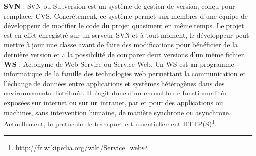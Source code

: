 \pagebreak

\textbf{SVN} : SVN ou Subversion est un système de gestion de version, conçu pour remplacer CVS. Concrètement, ce système permet aux membres d’une équipe de développeur de modifier le code du projet quasiment en même temps. Le projet est en effet enregistré sur un serveur SVN et à tout moment, le développeur peut mettre à jour une classe avant de faire des modifications pour bénéficier de la dernière version et a la possibilité de comparer deux versions d'un même fichier.\\

\textbf{WS} : Acronyme de \og Web Service \fg ou Service Web. Un WS est un programme informatique de la famille des technologies web permettant la communication et l'échange de données entre applications et systèmes hétérogènes dans des environnements distribués. Il s'agit donc d'un ensemble de fonctionnalités exposées sur internet ou sur un intranet, par et pour des applications ou machines, sans intervention humaine, de manière synchrone ou asynchrone. Actuellement, le protocole de transport est essentiellement HTTP(S)\footnote{\url{http://fr.wikipedia.org/wiki/Service_web}}. \\